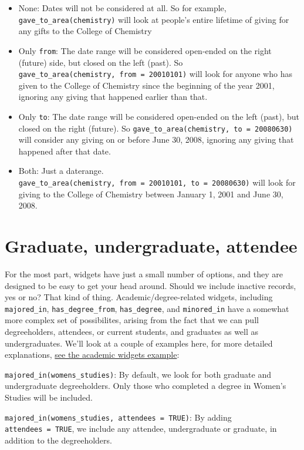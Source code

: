 \documentclass[]{book}
\providecommand{\tightlist}{%
  \setlength{\itemsep}{0pt}\setlength{\parskip}{0pt}}
\begin{document}
\begin{itemize}
\tightlist
\item
  None: Dates will not be considered at all. So for example, \texttt{gave\_to\_area(chemistry)} will look at people's entire lifetime of giving for any gifts to the College of Chemistry
\item
  Only \texttt{from}: The date range will be considered open-ended on the right (future) side, but closed on the left (past). So \texttt{gave\_to\_area(chemistry,\ from\ =\ 20010101)} will look for anyone who has given to the College of Chemistry since the beginning of the year 2001, ignoring any giving that happened earlier than that.
\item
  Only \texttt{to}: The date range will be considered open-ended on the left (past), but closed on the right (future). So \texttt{gave\_to\_area(chemistry,\ to\ =\ 20080630)} will consider any giving on or before June 30, 2008, ignoring any giving that happened after that date.
\item
  Both: Just a daterange. \texttt{gave\_to\_area(chemistry,\ from\ =\ 20010101,\ to\ =\ 20080630)} will look for giving to the College of Chemistry between January 1, 2001 and June 30, 2008.
\end{itemize}

\hypertarget{graduate-undergraduate-attendee}{%
\section{Graduate, undergraduate, attendee}\label{graduate-undergraduate-attendee}}

For the most part, widgets have just a small number of options, and they are designed to be easy to get your head around. Should we include inactive records, yes or no? That kind of thing. Academic/degree-related widgets, including \texttt{majored\_in}, \texttt{has\_degree\_from}, \texttt{has\_degree}, and \texttt{minored\_in} have a somewhat more complex set of possibilites, arising from the fact that we can pull degreeholders, attendees, or current students, and graduates as well as undergraduates. We'll look at a couple of examples here, for more detailed explanations, \protect\hyperlink{ex-academic}{see the academic widgets example}:

\texttt{majored\_in(womens\_studies)}: By default, we look for both graduate and undergraduate degreeholders. Only those who completed a degree in Women's Studies will be included.

\texttt{majored\_in(womens\_studies,\ attendees\ =\ TRUE)}: By adding \texttt{attendees\ =\ TRUE}, we include any attendee, undergraduate or graduate, in addition to the degreeholders.
\end{document}
